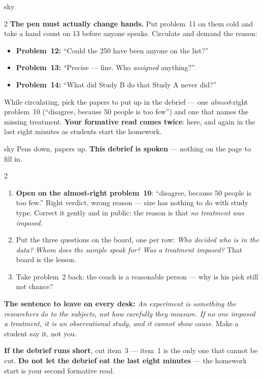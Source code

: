 \documentclass[10pt]{article}
\begin{document}
\begin{skillbox}{sky}
\begin{multicols}{2}
\textbf{The pen must actually change hands.} Put problem~11 on them cold and take a hand count
on 13 before anyone speaks. Circulate and demand the reason:
\begin{itemize}[leftmargin=1.1em, nosep]
  \item \textbf{Problem~12:} ``Could the 250 have been anyone on the list?''
  \item \textbf{Problem~13:} ``Precise --- fine. Who \emph{assigned} anything?''
  \item \textbf{Problem~14:} ``What did Study B do that Study A never did?''
\end{itemize}
While circulating, pick the papers to put up in the debrief --- one \emph{almost}-right
problem~10 (``disagree, because 50 people is too few'') and one that names the missing
treatment. \textbf{Your formative read comes twice}: here, and again in the last eight minutes
as students start the homework.
\end{multicols}
\end{skillbox}

\boxguard
\begin{skillbox}{sky}
Pens down, papers up. \textbf{This debrief is spoken} --- nothing on the page to fill in.
\begin{multicols}{2}
\begin{enumerate}[leftmargin=1.3em, nosep, itemsep=3pt]
  \item \textbf{Open on the almost-right problem~10}: ``disagree, because 50 people is too
        few.'' Right verdict, wrong reason --- size has nothing to do with study type. Correct
        it gently and in public: the reason is that \emph{no treatment was imposed}.
  \item Put the three questions on the board, one per row: \emph{Who decided who is in the
        data? Whom does the sample speak for? Was a treatment imposed?} That board is the
        lesson.
  \item Take problem~2 back: the coach is a reasonable person --- why is his pick still not
        chance?
\end{enumerate}
\columnbreak
\textbf{The sentence to leave on every desk:} \emph{An experiment is something the researchers
do to the subjects, not how carefully they measure. If no one imposed a treatment, it is an
observational study, and it cannot show cause.} Make a student say it, not you.

\textbf{If the debrief runs short}, cut item~3 --- item~1 is the only one that cannot be cut.
\textbf{Do not let the debrief eat the last eight minutes} --- the homework start is your
second formative read.
\end{multicols}
\end{skillbox}
\end{document}
